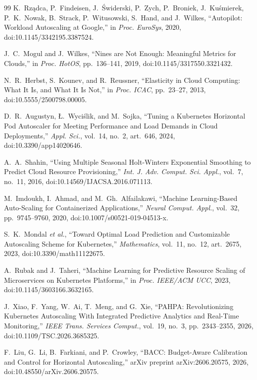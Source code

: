 \documentclass[journal]{IEEEtran}
\begin{document}
\begin{thebibliography}{99}
K.~Rz\k{a}dca, P.~Findeisen, J.~\'Swiderski, P.~Zych, P.~Broniek, J.~Ku\'smierek, P.~K.~Nowak, B.~Strack, P.~Witusowski, S.~Hand, and J.~Wilkes, ``Autopilot: Workload Autoscaling at Google,'' in \emph{Proc. EuroSys}, 2020, doi:10.1145/3342195.3387524.

J.~C.~Mogul and J.~Wilkes, ``Nines are Not Enough: Meaningful Metrics for Clouds,'' in \emph{Proc. HotOS}, pp.~136--141, 2019, doi:10.1145/3317550.3321432.

N.~R.~Herbst, S.~Kounev, and R.~Reussner, ``Elasticity in Cloud Computing: What It Is, and What It Is Not,'' in \emph{Proc. ICAC}, pp.~23--27, 2013, doi:10.5555/2500798.00005.

D.~R.~Augustyn, \L.~Wyci\'slik, and M.~Sojka, ``Tuning a Kubernetes Horizontal Pod Autoscaler for Meeting Performance and Load Demands in Cloud Deployments,'' \emph{Appl. Sci.}, vol.~14, no.~2, art.~646, 2024, doi:10.3390/app14020646.

A.~A.~Shahin, ``Using Multiple Seasonal Holt-Winters Exponential Smoothing to Predict Cloud Resource Provisioning,'' \emph{Int. J. Adv. Comput. Sci. Appl.}, vol.~7, no.~11, 2016, doi:10.14569/IJACSA.2016.071113.

M.~Imdoukh, I.~Ahmad, and M.~Gh.~Alfailakawi, ``Machine Learning-Based Auto-Scaling for Containerized Applications,'' \emph{Neural Comput. Appl.}, vol.~32, pp.~9745--9760, 2020, doi:10.1007/s00521-019-04513-x.

S.~K.~Mondal \emph{et al.}, ``Toward Optimal Load Prediction and Customizable Autoscaling Scheme for Kubernetes,'' \emph{Mathematics}, vol.~11, no.~12, art.~2675, 2023, doi:10.3390/math11122675.

A.~Rubak and J.~Taheri, ``Machine Learning for Predictive Resource Scaling of Microservices on Kubernetes Platforms,'' in \emph{Proc. IEEE/ACM UCC}, 2023, doi:10.1145/3603166.3632165.

J.~Xiao, F.~Yang, W.~Ai, T.~Meng, and G.~Xie, ``PAHPA: Revolutionizing Kubernetes Autoscaling With Integrated Predictive Analytics and Real-Time Monitoring,'' \emph{IEEE Trans. Services Comput.}, vol.~19, no.~3, pp.~2343--2355, 2026, doi:10.1109/TSC.2026.3685325.

F.~Liu, G.~Li, B.~Farkiani, and P.~Crowley, ``BACC: Budget-Aware Calibration and Control for Horizontal Autoscaling,'' arXiv preprint arXiv:2606.20575, 2026, doi:10.48550/arXiv.2606.20575.


\end{thebibliography}
\end{document}
